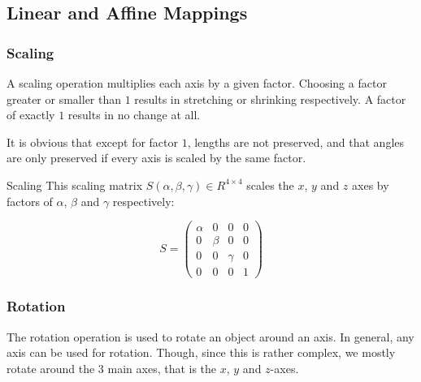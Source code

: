 \documentclass{panikzettel}
\begin{document}
\subsection{Linear and Affine Mappings}
\begin{halfboxl}
\vspace{-\baselineskip}
\subsubsection*{Scaling}

A scaling operation multiplies each axis by a given factor. Choosing a factor greater or smaller than $1$ results in stretching or shrinking respectively. A factor of exactly $1$ results in no change at all.

It is obvious that except for factor $1$, lengths are not preserved, and that angles are only preserved if every axis is scaled by the same factor.
\end{halfboxl}%
\begin{halfboxr}
\vspace{-\baselineskip}
\begin{defi}{Scaling}
This scaling matrix $S(\alpha, \beta, \gamma) \in R^{4\times4}$ scales the $x$, $y$ and $z$ axes by factors of $\alpha$, $\beta$ and $\gamma$ respectively:

$$S =\begin{pmatrix} \alpha & 0 & 0 & 0 \\ 0 & \beta & 0 & 0 \\ 0 & 0 & \gamma & 0 \\ 0 & 0 & 0 & 1 \end{pmatrix}$$

\end{defi}
\end{halfboxr}

\subsubsection*{Rotation}

The rotation operation is used to rotate an object around an axis. In general, any axis can be used for rotation. Though, since this is rather complex, we mostly rotate around the 3 main axes, that is the $x$, $y$ and $z$-axes.
\end{document}
